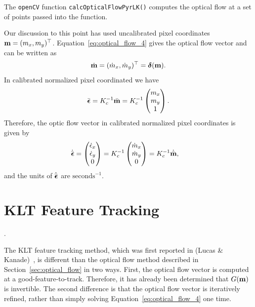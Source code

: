 The \texttt{openCV} function \texttt{calcOpticalFlowPyrLK()} computes the optical flow at a set of points passed into the function.

Our discussion to this point has used uncalibrated pixel coordinates $\mathbf{m} = (m_x, m_y)^\top$.  Equation~\eqref{eq:optical_flow_4} gives the optical flow vector and can be written as
\[
\dot{\mathbf{m}} = (\dot{m}_x, \dot{m}_y)^\top = \boldsymbol{\delta}(\mathbf{m}).
\]
In calibrated normalized pixel coordinated we have
\[
\bar{\boldsymbol{\epsilon}} = K_c^{-1}\bar{\mathbf{m}} = K_c^{-1}\begin{pmatrix} m_x \\ m_y \\ 1 \end{pmatrix}.
\]
Therefore, the optic flow vector in calibrated normalized pixel coordinates is given by
\begin{align*}
	\dot{\bar{\boldsymbol{\epsilon}}} 
		&= \begin{pmatrix} \dot{\epsilon}_x \\ \dot{\epsilon}_y \\ 0 \end{pmatrix}  
		= K_c^{-1} \begin{pmatrix} \dot{m}_x \\ \dot{m}_y \\ 0 \end{pmatrix} 
		= K_c^{-1} \dot{\bar{\mathbf{m}}},
\end{align*}
and the units of $\dot{\bar{\boldsymbol{\epsilon}}}$ are $\text{seconds}^{-1}$.

\section{KLT Feature Tracking}
\label{sec:klt_feature_tracking}.

The KLT feature tracking method, which was first reported in (Lucas \& Kanade)~\cite{LucasKanade81}, is different than the optical flow method described in Section~\ref{sec:optical_flow} in two ways. 
First, the optical flow vector is computed at a good-feature-to-track.  Therefore, it has already been determined that $G(\mathbf{m})$ is invertible.  The second difference is that the optical flow vector is iteratively refined, rather than simply solving Equation~\eqref{eq:optical_flow_4} one time.  

